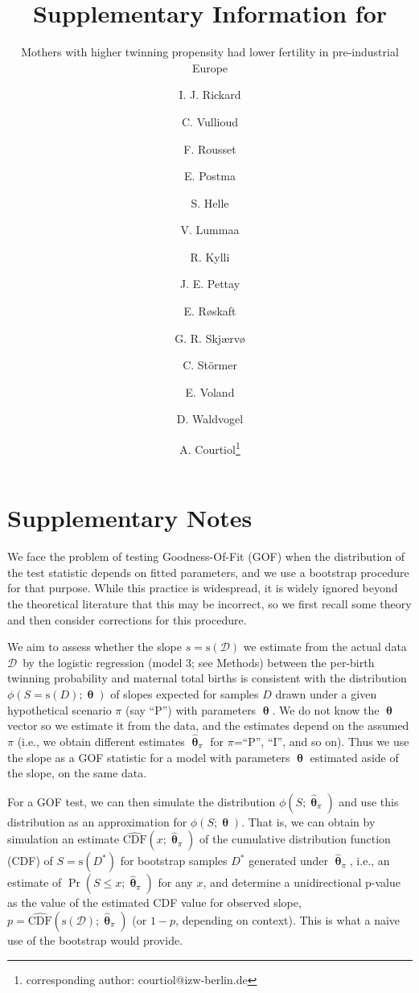 \documentclass[a4paper]{article}\usepackage[]{graphicx}\usepackage[]{color}
\title{Supplementary Information for}
\subtitle{Mothers with higher twinning propensity had lower fertility in pre-industrial Europe}
\author{I. J. Rickard \and C. Vullioud \and F. Rousset \and E. Postma \and S.
Helle \and V. Lummaa \and R. Kylli \and J. E. Pettay \and E.
Røskaft \and G. R. Skjærvø \and C. Störmer \and E. Voland \and D.
Waldvogel \and A. Courtiol\footnote{corresponding author: courtiol@izw-berlin.de}}
\date{}
\newcommand{\adata}{\ensuremath{\mathcal{D}}}
\newcommand{\data}{\ensuremath{D}}
\newcommand{\CDF}{\ensuremath{\mathrm{CDF}}}
\newcommand{\sfn}{\ensuremath{\mathrm{s}}}
\newcommand{\bth}{\ensuremath{\bm{\uptheta}}}
\begin{document}
\renewcommand{\figurename}{Supplementary Figure}
\renewcommand{\tablename}{Supplementary Table}
\renewcommand\refname{\textbf{Supplementary References}}



\maketitle

\tableofcontents





\newpage

\section{Supplementary Notes}

We face the problem of testing Goodness-Of-Fit (GOF) when the distribution of the test statistic depends on fitted parameters, and we use a bootstrap procedure for that purpose. While this practice is widespread, it is widely ignored beyond the theoretical literature that this may be incorrect, so we first recall some theory and then consider corrections for this procedure.

We aim to assess whether the slope $s=\sfn(\adata)$ we estimate from the actual data \adata\ by the logistic regression (model 3; see Methods) between the per-birth twinning probability and maternal total births is consistent with the distribution $\phi(S=\sfn(\data) ; \bth)$ of slopes expected for samples $\data$ drawn under a given hypothetical scenario $\pi$ (say ``P'') with parameters $\bth$. We do not know the $\bth$ vector so we estimate it from the data, and the estimates  depend on the assumed $\pi$ (i.e., we obtain different estimates $\hat{\bth}_\pi$ for $\pi$=``P'', ``I'', and so on). Thus we use the slope as a GOF statistic for a model with parameters $\bth$ estimated aside of the slope, on the same data.

For a GOF test, we can then simulate the distribution $\phi(S;\hat{\bth}_\pi)$ and use this distribution as an approximation for $\phi(S; \bth)$. That is, we can obtain by simulation an estimate $\hat{\CDF}(x;\hat{\bth}_\pi)$ of the cumulative distribution function (CDF) of $S=\sfn(\data^*)$ for bootstrap samples $\data^*$ generated under $\hat{\bth}_\pi$, i.e., an estimate of $\Pr(S\leq x; \hat{\bth}_\pi)$ for any $x$, and determine a unidirectional p-value as the value of the estimated CDF value for observed slope, $p=\hat{\CDF}(\sfn(\adata) ;\hat{\bth}_\pi)$ (or $1-p$, depending on context). This is what a naive use of the bootstrap would provide.
\end{document}

